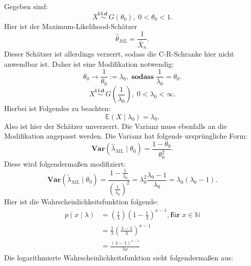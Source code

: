\documentclass[10pt]{article}
\newcommand{\EW}{\mathbb{E}} %
\newcommand{\Var}{\textbf{Var}} %
\newenvironment{BSP}[1][]
{\begin{Beispiel}[frametitle=#1]}{\end{Beispiel}}
\begin{document}
	\begin{BSP}[Beispiel 1.4.3 (Anwendung C-R-Schrank Geometrische Verteilung)]
	Gegeben sind:
		\begin{equation*}
			X \overset{\textbf{i.i.d.}}{\sim} G(\theta_0), \; 0 < \theta_0 < 1.
		\end{equation*}
		Hier ist der Maximum-Likelihood-Schätzer
		\begin{equation*}
			\hat{\theta}_{ML} = \frac{1}{\bar{X}_n}.
		\end{equation*}
		Dieser Schätzer ist allerdings verzerrt, sodass die C-R-Schranke hier nicht anwendbar ist. Daher ist eine Modifikation notwendig:
		\begin{equation*}
			\theta_0 \rightarrow \frac{1}{\theta_0} := \lambda_0, \; \textbf{sodass} \; \frac{1}{\lambda_0} = \theta_0.
		\end{equation*}
		\begin{equation*}
			X \overset{\textbf{i.i.d.}}{\sim} G(\frac{1}{\lambda_0}), \; 0 < \lambda_0 < \infty.
		\end{equation*}
		Hierbei ist Folgendes zu beachten:
		\begin{equation*}
			\EW (X \mid \lambda_0) = \lambda_0.
		\end{equation*}
		Also ist hier der Schätzer unverzerrt. Die Varianz muss ebenfalls an die Modifikation angepasst werden. Die Varianz hat folgende ursprüngliche Form:
		\begin{equation*}
			\Var(\hat{\lambda}_{ML} \mid \theta_0) = \frac{1 - \theta_0}{\theta^2_0}.
		\end{equation*}
		Diese wird folgendermaßen modifiziert:
		\begin{equation*}
			\Var(\tilde{\lambda}_{ML} \mid \theta_0) = \frac{1- \frac{1}{\lambda_0}}{\left(\frac{1}{\lambda_0}\right)^2} =\lambda^2_0 \frac{\lambda_0-1}{\lambda_0} = \lambda_0(\lambda_0-1). 
		\end{equation*}
		Hier ist die Wahrscheinlichkeitsfunktion folgende:
		\begin{equation*}
			\begin{split}
				p(x\mid \lambda) &= \left(\frac{1}{\lambda}\right)\left(1- \frac{1}{\lambda}\right)^{x-1}, \textbf{für}\; x \in \mathbb{N}\\
				&= \frac{1}{\lambda}\left(\frac{\lambda-1}{\lambda}\right)^{x-1}\\
				&= \frac{(\lambda -1)^{x-1}}{\lambda x}
			\end{split}
		\end{equation*}
		Die logarithmierte Wahrscheinlichkeitsfunktion sieht folgendermaßen aus: 

\end{BSP}
\end{document}

